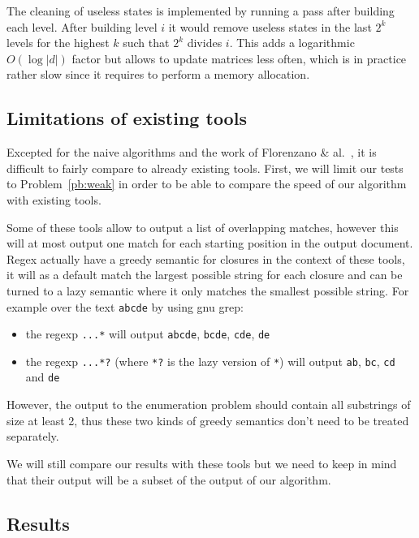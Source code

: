 \documentclass[12px]{article}
\theoremstyle{definition}
\begin{document}
      The cleaning of useless states is implemented by running a pass after
      building each level. After building level $i$ it would remove useless
      states in the last $2^k$ levels for the highest $k$ such that $2^k$
      divides $i$. This adds a logarithmic $O(\log |d|)$ factor but allows to
      update  matrices less often, which is in practice rather
      slow since it requires to perform a memory allocation.

    \subsection{Limitations of existing tools}

      Excepted for the naive algorithms and the work of Florenzano \&
      al.~\cite{florenzano2018constant}, it is difficult to fairly compare to
      already existing tools. First, we will limit our tests to
      Problem~\ref{pb:weak} in order to be able to compare the speed of our
      algorithm with existing tools.

      Some of these tools allow to output a list of overlapping matches,
      however this will at most output one match for each starting position in
      the output document. Regex actually have a greedy semantic for closures
      in the context of these tools, it will as a default match the largest
      possible string for each closure and can be turned to a lazy semantic
      where it only matches the smallest possible string. For example over the
      text \texttt{abcde} by using gnu grep:
        \begin{itemize}
          \item the regexp \texttt{...*} will output \texttt{abcde},
            \texttt{bcde}, \texttt{cde}, \texttt{de}
          \item the regexp \texttt{...*?} (where \texttt{*?} is the lazy
            version of \texttt{*}) will output \texttt{ab}, \texttt{bc},
            \texttt{cd} and \texttt{de}
        \end{itemize}
      However, the output to the enumeration problem should contain all
      substrings of size at least 2, thus these two kinds of greedy semantics
      don't need to be treated separately.

      We will still compare our results with these tools but we need to
      keep in mind that their output will be a subset of the output of our
      algorithm.

    \subsection{Results}
\end{document}
